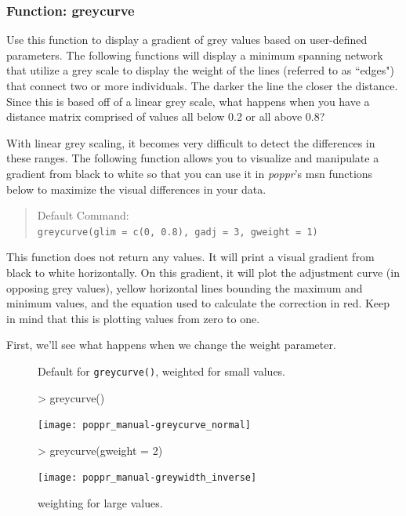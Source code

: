 \documentclass[letterpaper]{article}
\newcommand{\tab}{\hspace*{1em}}
\begin{document}
\subsubsection{Function: greycurve}\label{index:trees:greycurve}
\tab\tab Use this function to display a gradient of grey values based on user-defined parameters. The following functions will display a minimum spanning network that utilize a grey scale to display the weight of the lines (referred to as ``edges") that connect two or more individuals. The darker the line the closer the distance. Since this is based off of a linear grey scale, what happens when you have a distance matrix comprised of values all below 0.2 or all above 0.8? 

With linear grey scaling, it becomes very difficult to detect the differences in these ranges. The following function allows you to visualize and manipulate a gradient from black to white so that you can use it in \textit{poppr}'s msn functions below to maximize the visual differences in your data.

\begin{quote}
Default Command:\\
\texttt{greycurve(glim = c(0, 0.8), gadj = 3, gweight = 1)}
\end{quote}


This function does not return any values. It will print a visual gradient from black to white horizontally. On this gradient, it will plot the adjustment curve (in opposing grey values), yellow horizontal lines bounding the maximum and minimum values, and the equation used to calculate the correction in red. Keep in mind that this is plotting values from zero to one.

First, we'll see what happens when we change the weight parameter.
\begin{figure}[h!]
\begin{minipage}[b]{0.45\linewidth}
\centering
\caption{\footnotesize Default for \texttt{greycurve()}, weighted for small values.}
\begin{Schunk}
\begin{Sinput}
> greycurve()
\end{Sinput}
\end{Schunk}
\texttt{[image: poppr\_manual-greycurve\_normal]}
\end{minipage}
\hspace{0.5cm}
\begin{minipage}[b]{0.45\linewidth}
\centering
\caption{\footnotesize weighting for large values.}
\begin{Schunk}
\begin{Sinput}
> greycurve(gweight = 2)
\end{Sinput}
\end{Schunk}
\texttt{[image: poppr\_manual-greywidth\_inverse]}
\end{minipage}
\end{figure}
\end{document}
